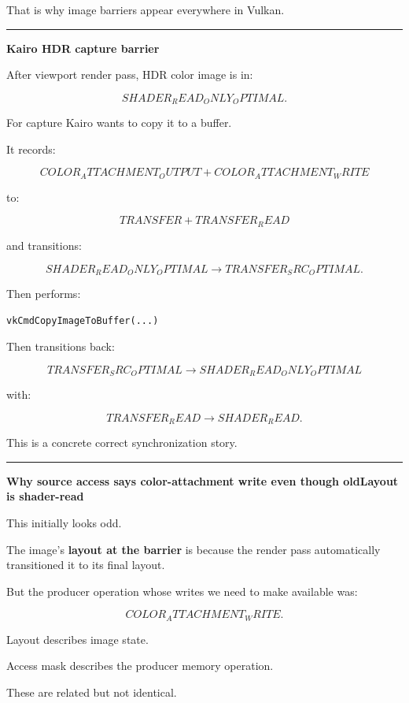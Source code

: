 That is why image barriers appear everywhere in Vulkan.

\begin{center}\rule{0.5\linewidth}{0.5pt}\end{center}

\textbf{Kairo HDR capture barrier}

After viewport render pass, HDR color image is in:

\[
SHADER_READ_ONLY_OPTIMAL.
\]

For capture Kairo wants to copy it to a buffer.

It records:

\[
COLOR_ATTACHMENT_OUTPUT
+
COLOR_ATTACHMENT_WRITE
\]

to:

\[
TRANSFER
+
TRANSFER_READ
\]

and transitions:

\[
SHADER_READ_ONLY_OPTIMAL
\rightarrow
TRANSFER_SRC_OPTIMAL.
\]

Then performs:

\begin{verbatim}
vkCmdCopyImageToBuffer(...)
\end{verbatim}

Then transitions back:

\[
TRANSFER_SRC_OPTIMAL
\rightarrow
SHADER_READ_ONLY_OPTIMAL
\]

with:

\[
TRANSFER_READ
\rightarrow
SHADER_READ.
\]

This is a concrete correct synchronization story.

\begin{center}\rule{0.5\linewidth}{0.5pt}\end{center}

\textbf{Why source access says color-attachment write even though oldLayout is shader-read}

This initially looks odd.

The image's \textbf{layout at the barrier} is  because the render pass automatically transitioned it to its final layout.

But the producer operation whose writes we need to make available was:

\[
COLOR_ATTACHMENT_WRITE.
\]

Layout describes image state.

Access mask describes the producer memory operation.

These are related but not identical.

